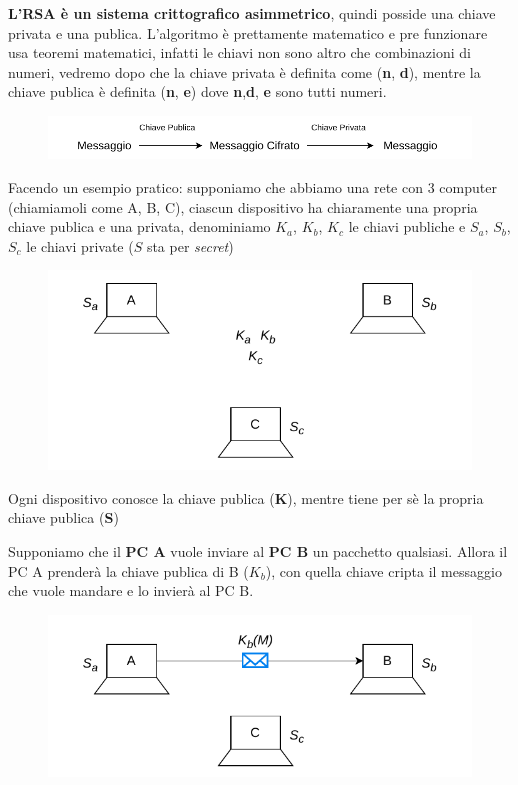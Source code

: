 \documentclass{rapport}
\begin{document}
\textbf{L'RSA è un sistema crittografico asimmetrico}, quindi posside una chiave privata e una publica. L'algoritmo è prettamente matematico e pre funzionare usa teoremi matematici, infatti le chiavi non sono altro che combinazioni di numeri, vedremo dopo che la chiave privata è definita come (\textbf{n}, \textbf{d}), mentre la chiave publica è definita (\textbf{n}, \textbf{e}) dove \textbf{n},\textbf{d}, \textbf{e} sono tutti numeri. 

\begin{figure} [h]
    \centering
    \includegraphics[width=0.9\linewidth]{logos/crit1.pdf}
\end{figure}

Facendo un esempio pratico: supponiamo che abbiamo una rete con 3 computer (chiamiamoli come A, B, C), ciascun dispositivo ha chiaramente una propria chiave publica e una privata, denominiamo $K_a$, $K_b$, $K_c$ le chiavi publiche e $S_a$, $S_b$, $S_c$ le chiavi private ($S$ sta per \textit{secret})




\begin{figure} [h]
    \centering
    \includegraphics[width=0.7\linewidth]{logos/crit2.pdf}
\end{figure}

Ogni dispositivo conosce la chiave publica (\textbf{K}), mentre tiene per sè la propria chiave publica (\textbf{S})


Supponiamo che il \textbf{PC A} vuole inviare al \textbf{PC B} un pacchetto qualsiasi. Allora il PC A prenderà la chiave publica di B (\textbf{$K_b$}), con quella chiave cripta il messaggio che vuole mandare e lo invierà al PC B.


\begin{figure} [h]
    \centering
    \includegraphics[width=0.7\linewidth]{logos/crit3.pdf}
\end{figure}
\end{document}
